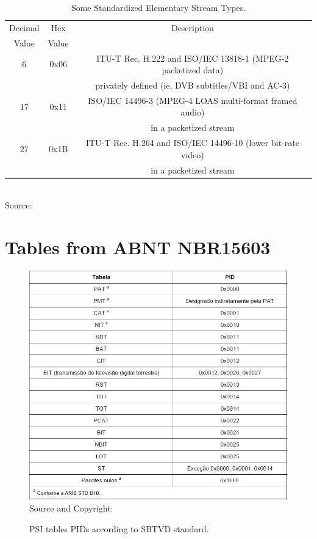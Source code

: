 \documentclass[
	12pt,				%
	openright,			%
	twoside,			%
	a4paper,			%
	brazil,
	french,				%
	english
	]{abntex2}
\begin{document}
\begin{anexosenv}
\begin{table}[!htpd]
\caption{Some Standardized Elementary Stream Types.}
\begin{center}
\begin{tabular}{|c|c|c|}
\hline
Decimal & Hex & Description \\
Value & Value & \\
\hline
6 & 0x06 & ITU-T Rec. H.222 and ISO/IEC 13818-1 (MPEG-2 packetized data)\\
 & & privately defined (ie, DVB subtitles/VBI and AC-3)\\
 \hline
17 & 0x11 & ISO/IEC 14496-3 (MPEG-4 LOAS multi-format framed audio)\\
 & & in a packetized stream \\
 \hline
27 & 0x1B & ITU-T Rec. H.264 and ISO/IEC 14496-10 (lower bit-rate video)\\
 & & in a packetized stream \\
\hline
\end{tabular}
\label{tab_ISOESTypes}
\\Source: \cite[2.4.4.9]{ISO}
\end{center}
\end{table}


\chapter{Tables from ABNT NBR15603}
\label{tables_abnt}

\begin{figure}[!hb]
\centering
\caption{PSI tables PIDs according to SBTVD standard.}
\includegraphics[width=0.7\linewidth]{figuras/tab_psi_tables_names_pids_abnt.png}
\\Source and Copyright: 
\label{fig:tab_psi_tables_names_pids_abnt}
\end{figure}


\end{anexosenv}
\end{document}
